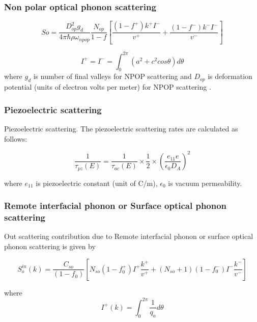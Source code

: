 \documentclass[12pt]{article}
\begin{document}
\subsubsection{Non polar optical phonon scattering}
\begin{equation}
So = \frac{D_{op}^2 g_d}{4\pi\hbar\rho\omega_{npop}} \frac{N_{op}}{1-f} \left[  \frac{(1-f^+)k^+ I^-}{v^+} + \frac{(1-f^-)k^- I^-}{v^-}  \right]
    \label{So}
\end{equation}

\begin{equation}
I^+ = I^- = \int_0^{2\pi}(a^2 + c^2 cos\theta) d\theta
    \label{I_plus}
\end{equation}
where $g_d$ is number of final valleys for NPOP scattering and $D_{op}$ is deformation potential (units of electron volts per meter) for NPOP scattering .

\subsubsection{Piezoelectric scattering}
Piezoelectric scattering. The piezoelectric scattering rates \cite{kaasbjerg2013acoustic} are calculated as follows: 

\begin{equation}
\frac{1}{\tau_{pz}(E)} = \frac{1}{\tau_{ac}(E)} \times \frac{1}{2}\times \left( \frac{e_{11} e}{\epsilon_0 D_{A}}\right) ^2 
\label{acoustic_rate}
\end{equation}

where $e_{11}$ is piezoelectric constant (unit of C/m), $\epsilon_0$ is vacuum permeability.   

\subsubsection{Remote interfacial phonon or Surface optical phonon scattering}

Out scattering contribution due to Remote interfacial phonon or surface optical phonon scattering is given by 

\begin{equation}
S_{o}^{in}(k) = \frac{C_{so}}{(1- f_{0})} [N_{so} (1 - f_{0}^+) I^+ \frac{k^+}{v^+}  + (N_{so}+1) (1 - f_{0}^-) I^- \frac{k^-}{v^-}]
\label{out_sc_so}
\end{equation}

where 
\begin{equation}
I^{+}(k) = \int_0^{2\pi} \frac{1}{q_{a}} d\theta 
\label{J_plus_so}
\end{equation}
\end{document}
